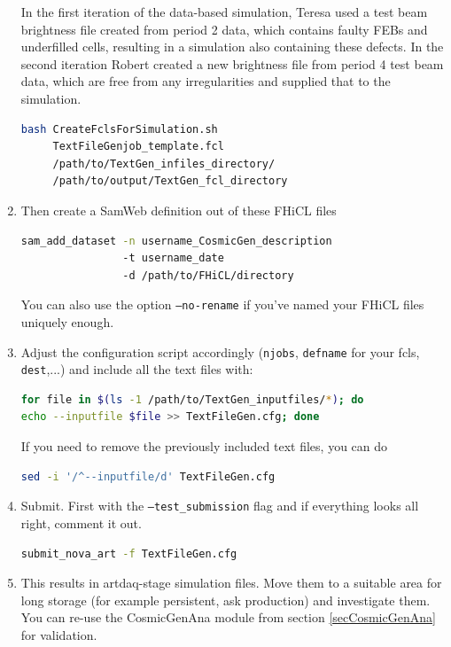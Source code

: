 \documentclass[12pt]{article}
\begin{document}
\begin{enumerate}
In the first iteration of the data-based simulation, Teresa used a test beam brightness file created from period 2 data, which contains faulty FEBs and underfilled cells, resulting in a simulation also containing these defects. In the second iteration Robert created a new brightness file from period 4 test beam data, which are free from any irregularities and supplied that to the simulation.

\begin{lstlisting}[frame=single,language=bash]
bash CreateFclsForSimulation.sh
     TextFileGenjob_template.fcl
     /path/to/TextGen_infiles_directory/
     /path/to/output/TextGen_fcl_directory
\end{lstlisting}

\item Then create a SamWeb definition out of these FHiCL files
\begin{lstlisting}[frame=single,language=bash]
sam_add_dataset -n username_CosmicGen_description
                -t username_date
                -d /path/to/FHiCL/directory
\end{lstlisting}
You can also use the option \texttt{--no-rename} if you've named your FHiCL files uniquely enough.

\item Adjust the configuration script accordingly (\texttt{njobs}, \texttt{defname} for your fcls, \texttt{dest},...) and include all the text files with:
\begin{lstlisting}[frame=single,language=bash]
for file in $(ls -1 /path/to/TextGen_inputfiles/*); do
echo --inputfile $file >> TextFileGen.cfg; done
\end{lstlisting}
If you need to remove the previously included text files, you can do
\begin{lstlisting}[frame=single,language=bash]
sed -i '/^--inputfile/d' TextFileGen.cfg
\end{lstlisting}

\item Submit. First with the \texttt{--test\_submission} flag and if everything looks all right, comment it out.
\begin{lstlisting}[frame=single,language=bash]
submit_nova_art -f TextFileGen.cfg
\end{lstlisting}

\item This results in artdaq-stage simulation files. Move them to a suitable area for long storage (for example persistent, ask production) and investigate them. You can re-use the CosmicGenAna module from section \ref{secCosmicGenAna} for validation.


\end{enumerate}
\end{document}
